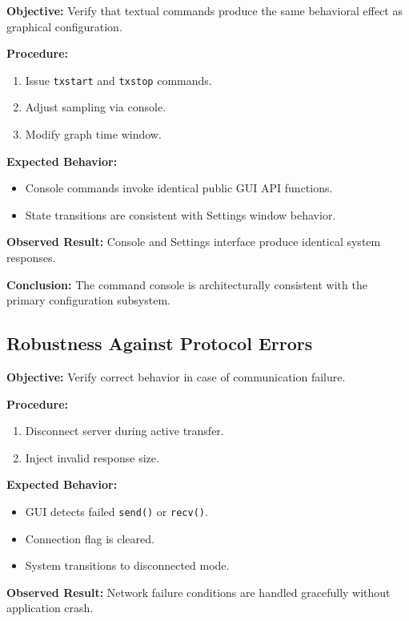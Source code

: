\textbf{Objective:}  
Verify that textual commands produce the same behavioral effect as graphical configuration.

\textbf{Procedure:}
\begin{enumerate}
	\item Issue \texttt{txstart} and \texttt{txstop} commands.
	\item Adjust sampling via console.
	\item Modify graph time window.
\end{enumerate}

\textbf{Expected Behavior:}
\begin{itemize}
	\item Console commands invoke identical public GUI API functions.
	\item State transitions are consistent with Settings window behavior.
\end{itemize}

\textbf{Observed Result:}  
Console and Settings interface produce identical system responses.

\textbf{Conclusion:}  
The command console is architecturally consistent with the primary configuration subsystem.

\subsection{Robustness Against Protocol Errors}
\label{sec:gui_validation_errors}

\textbf{Objective:}  
Verify correct behavior in case of communication failure.

\textbf{Procedure:}
\begin{enumerate}
	\item Disconnect server during active transfer.
	\item Inject invalid response size.
\end{enumerate}

\textbf{Expected Behavior:}
\begin{itemize}
	\item GUI detects failed \texttt{send()} or \texttt{recv()}.
	\item Connection flag is cleared.
	\item System transitions to disconnected mode.
\end{itemize}

\textbf{Observed Result:}  
Network failure conditions are handled gracefully without application crash.

